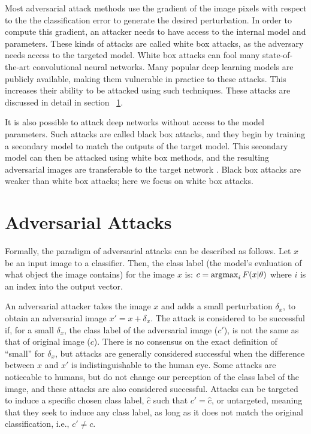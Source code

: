 Most adversarial attack methods use the gradient of the image pixels with respect to the the classification error to generate the desired perturbation.
In order to compute this gradient, an attacker needs to have access to the internal model and parameters.
These kinds of attacks are called white box attacks, as the adversary needs access to the targeted model. 
White box attacks can fool many state-of-the-art convolutional neural networks. 
Many popular deep learning models are publicly available, making them vulnerable in practice to these attacks.
This increases their ability to be attacked using such techniques.
These attacks are discussed in detail in section  ~\ref{attacks}.

It is also possible to attack deep networks without access to the model parameters. 
Such attacks are called black box attacks, and they begin by training a secondary model to match the outputs of the target model.
This secondary model can then be attacked using white box methods, and the resulting adversarial images are transferable to the target network \cite{Papernot2016PracticalBA}. 
Black box attacks are weaker than white box attacks; here we focus on white box attacks. 

\section{Adversarial Attacks} \label{attacks}
Formally, the paradigm of adversarial attacks can be described as follows. 
Let $x$ be an input image to a classifier. 
Then, the class label (the model's evaluation of what object the image contains) for the image $x$ is: $c = \operatorname*{\arg\!\max}_{i} F(x|\theta)$ where $i$ is an index into the output vector.

An adversarial attacker takes the image $x$ and adds a small perturbation $\delta_x$, to obtain an adversarial image $x' = x + \delta_x$.
The attack is considered to be successful if, for a small $\delta_x$, the class label of the adversarial image ($c'$), is not the same as that of original image ($c$). 
There is no consensus on the exact definition of  ``small'' for $\delta_x$, but attacks are generally considered successful when the difference between $x$ and $x'$ is indistinguishable to the human eye. Some attacks are noticeable to humans, but do not change our perception of the class label of the image, and these attacks are also considered successful.  %
Attacks can be targeted to induce a specific chosen class label, $\hat{c}$ such that $c' = \hat{c}$, or untargeted, meaning that they seek to induce any class label, as long as it does not match the original classification, i.e., $c' \neq c$.

